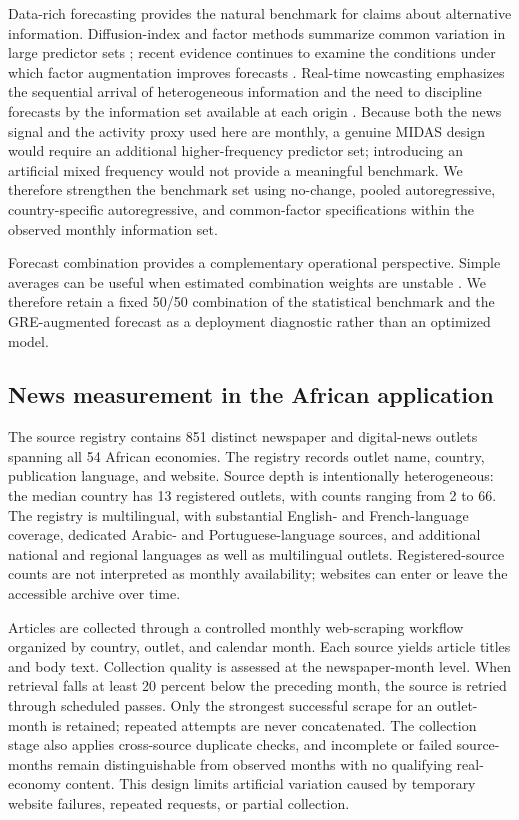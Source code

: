 \documentclass[preprint,12pt,authoryear]{elsarticle}
\begin{document}
Data-rich forecasting provides the natural benchmark for claims about alternative information. Diffusion-index and factor methods summarize common variation in large predictor sets \citep{stockwatson2002}; recent evidence continues to examine the conditions under which factor augmentation improves forecasts \citep{bae2024}. Real-time nowcasting emphasizes the sequential arrival of heterogeneous information and the need to discipline forecasts by the information set available at each origin \citep{giannone2008,banbura2013,bok2018}. Because both the news signal and the activity proxy used here are monthly, a genuine MIDAS design would require an additional higher-frequency predictor set; introducing an artificial mixed frequency would not provide a meaningful benchmark. We therefore strengthen the benchmark set using no-change, pooled autoregressive, country-specific autoregressive, and common-factor specifications within the observed monthly information set.

Forecast combination provides a complementary operational perspective. Simple averages can be useful when estimated combination weights are unstable \citep{timmermann2006,stockwatson2004}. We therefore retain a fixed 50/50 combination of the statistical benchmark and the GRE-augmented forecast as a deployment diagnostic rather than an optimized model.

\subsection{News measurement in the African application}
The source registry contains 851 distinct newspaper and digital-news outlets spanning all 54 African economies. The registry records outlet name, country, publication language, and website. Source depth is intentionally heterogeneous: the median country has 13 registered outlets, with counts ranging from 2 to 66. The registry is multilingual, with substantial English- and French-language coverage, dedicated Arabic- and Portuguese-language sources, and additional national and regional languages as well as multilingual outlets. Registered-source counts are not interpreted as monthly availability; websites can enter or leave the accessible archive over time.

Articles are collected through a controlled monthly web-scraping workflow organized by country, outlet, and calendar month. Each source yields article titles and body text. Collection quality is assessed at the newspaper-month level. When retrieval falls at least 20 percent below the preceding month, the source is retried through scheduled passes. Only the strongest successful scrape for an outlet-month is retained; repeated attempts are never concatenated. The collection stage also applies cross-source duplicate checks, and incomplete or failed source-months remain distinguishable from observed months with no qualifying real-economy content. This design limits artificial variation caused by temporary website failures, repeated requests, or partial collection.
\end{document}
